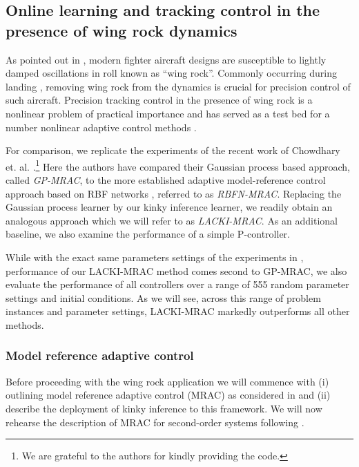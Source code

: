 \subsection{Online learning and tracking control in the presence of wing rock dynamics }
\label{sec:KIMRAC}
As pointed out in \cite{chowdharyacc2013}, modern fighter aircraft designs are susceptible to lightly damped oscillations in roll known as ``wing rock''. Commonly occurring during landing \cite{Saad2000}, removing wing rock from the dynamics is crucial for precision control of such aircraft.
Precision tracking control in the presence of wing rock is a nonlinear problem of practical importance and has served as a test bed for a number nonlinear adaptive control methods \cite{Chowdhary2013,Monahemi1996,chowdharyacc2013}.

For comparison, we replicate the experiments of the recent work of Chowdhary et. al. \cite{Chowdhary2013,ChowdharyCDC2013}.\footnote{We are grateful to the authors for kindly providing the code.}
Here the authors have compared their Gaussian process based approach, called \textit{GP-MRAC}, to the more established adaptive model-reference control approach based on RBF networks \cite{Sanner1992,Kim1998}, referred to as \textit{RBFN-MRAC}. Replacing the Gaussian process learner by our kinky inference learner, we readily obtain an analogous approach which we will refer to as \textit{LACKI-MRAC}. As an additional baseline, we also examine the performance of a simple P-controller.

While with the exact same parameters settings of the experiments in \cite{Chowdhary2013}, performance of our LACKI-MRAC method comes second to GP-MRAC, we also evaluate the performance of all controllers over a range of 555 random parameter settings and initial conditions. As we will see, across this range of problem instances and parameter settings, LACKI-MRAC markedly outperforms all other methods.

\subsubsection{Model reference adaptive control}\label{sec:mrac}
Before proceeding with the wing rock application we will commence with (i) outlining model reference adaptive control (MRAC) \cite{astroemadaptivectrlbook2013} as considered in \cite{Chowdhary2013} and (ii) describe the deployment of kinky inference to this framework. 
We will now rehearse the description of MRAC for second-order systems following \cite{Chowdhary2013}. 

